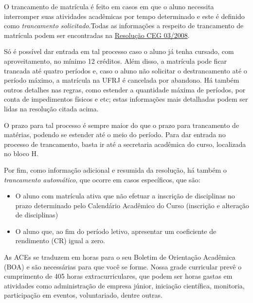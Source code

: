         O trancamento de matrícula é feito em casos em que o aluno necessita interromper suas atividades acadêmicas por tempo determinado e este é definido como \textit{trancamento solicitado}.Todas as informações a respeito de trancamento de matrícula podem ser encontradas na \href{http://caxias.ufrj.br/images/Resolucao_CEG_03_08.pdf}{Resolução CEG 03/2008}.
        
        Só é possível dar entrada em tal processo caso o aluno já tenha cursado, com aproveitamento, no mínimo 12 créditos. Além disso, a matrícula pode ficar trancada até quatro períodos e, caso o aluno não solicitar o destrancamento até o período máximo, a matrícula na UFRJ é cancelada por abandono. Há também outros detalhes nas regras, como estender a quantidade máxima de períodos, por conta de impedimentos físicos e etc; estas informações mais detalhadas podem ser lidas na resolução citada acima.
        
        O prazo para tal processo é sempre maior do que o prazo para trancamento de matérias, podendo se estender até o meio do período. Para dar entrada no processo de trancamento, basta ir até a secretaria acadêmica do curso, localizada no bloco H.
        
        Por fim, como informação adicional e resumida da resolução, há também o \textit{trancamento automático}, que ocorre em casos específicos, que são:
        
        \begin{itemize}
            \item O aluno com matrícula ativa que não efetuar a inscrição de disciplinas no prazo determinado pelo Calendário Acadêmico do Curso (inscrição e alteração de disciplinas)
            \item O aluno que, ao fim do período letivo, apresentar um coeficiente de rendimento (CR) igual a zero.  
        \end{itemize}
        
        As ACEs se traduzem em horas para o seu Boletim de Orientação Acadêmica (BOA) e são necessárias para que você se forme. Nossa grade curricular prevê o cumprimento de 405 horas extracurriculares, que podem ser horas gastas em atividades como administração de empresa júnior, iniciação científica, monitoria, participação em eventos, voluntariado, dentre outras. 
        
